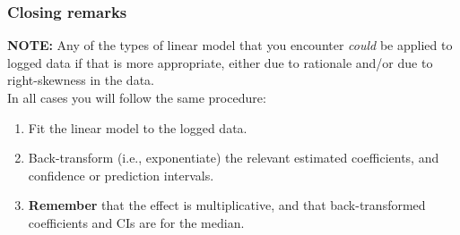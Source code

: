 \documentclass{beamer}\usepackage[]{graphicx}\usepackage[]{xcolor}
\begin{document}
\begin{frame}[fragile]
\frametitle{Closing remarks}
\textbf{NOTE:} Any of the types of linear model that you encounter {\em could} be
applied to logged data if that is more appropriate, either due to rationale and/or 
due to right-skewness in the data.\\
\bigskip
In all cases you will follow the same procedure:\\
\bigskip
\begin{enumerate}[1.]\setlength{\itemsep}{5mm}
\item Fit the linear model to the logged data.
\item Back-transform (i.e., exponentiate) the relevant estimated coefficients, and confidence or 
prediction intervals.
\item \textbf{Remember} that the effect is multiplicative, 
and that back-transformed coefficients and CIs are for the median.
\end{enumerate}
\end{frame}
\end{document}
